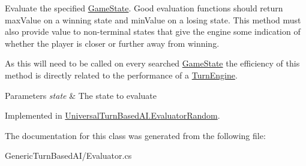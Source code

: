 Evaluate the specified \hyperlink{class_universal_turn_based_a_i_1_1_game_state}{Game\+State}. Good evaluation functions should return max\+Value on a winning state and min\+Value on a losing state. This method must also provide value to non-\/terminal states that give the engine some indication of whether the player is closer or further away from winning. 

As this will need to be called on every searched \hyperlink{class_universal_turn_based_a_i_1_1_game_state}{Game\+State} the efficiency of this method is directly related to the performance of a \hyperlink{class_universal_turn_based_a_i_1_1_turn_engine}{Turn\+Engine}. 


\begin{DoxyParams}{Parameters}
{\em state} & The state to evaluate\\
\hline
\end{DoxyParams}


Implemented in \hyperlink{class_universal_turn_based_a_i_1_1_evaluator_random_ac7248adff1c997e43c63e4f34fc3121c}{Universal\+Turn\+Based\+A\+I.\+Evaluator\+Random}.



The documentation for this class was generated from the following file\+:\begin{DoxyCompactItemize}
\item 
Generic\+Turn\+Based\+A\+I/Evaluator.\+cs\end{DoxyCompactItemize}
